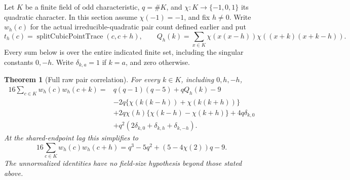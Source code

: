 \documentclass[11pt]{article}
\newtheorem{theorem}{Theorem}[section]
\begin{document}
Let \(K\) be a finite field of odd characteristic, \(q=\#K\), and
\(\chi:K\to\{-1,0,1\}\) its quadratic character. In this section assume
\(\chi(-1)=-1\), and fix \(h\ne0\). Write \(w_h(c)\) for the actual
irreducible-quadratic pair count defined earlier and put
\[
 t_h(c)=\operatorname{splitCubicPointTrace}(c,c+h),\qquad
 Q_h(k)=\sum_{x\in K}\chi(x(x-h))\chi((x+k)(x+k-h)).
\]
Every sum below is over the entire indicated finite set, including the
singular constants \(0,-h\). Write \(\delta_{k,a}=1\) if \(k=a\), and
zero otherwise.

\begin{theorem}[Full raw pair correlation]
For every \(k\in K\), including \(0,h,-h\),
\begin{align*}
 16\sum_{c\in K}w_h(c)w_h(c+k)
 ={}&q(q-1)(q-5)+qQ_h(k)-9\\
 &-2q\{\chi(k(k-h))+\chi(k(k+h))\}\\
 &+2q\chi(h)\{\chi(k-h)-\chi(k+h)\}+4q\delta_{k,0}\\
 &+q^2(2\delta_{k,0}+\delta_{k,h}+\delta_{k,-h}).
\end{align*}
At the shared-endpoint lag this simplifies to
\[
 16\sum_{c\in K}w_h(c)w_h(c+h)
 =q^3-5q^2+(5-4\chi(2))q-9.                 \tag{R}
\]
The unnormalized identities have no field-size hypothesis beyond those
stated above.
\end{theorem}
\end{document}
